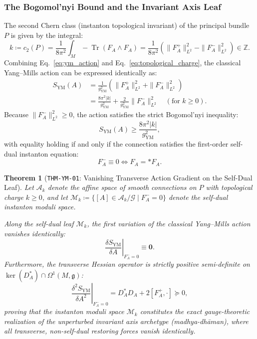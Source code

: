 \documentclass[11pt,a4paper,reqno]{article}
\theoremstyle{plain}
\newtheorem{theorem}{Theorem}[section]
\theoremstyle{definition}
\theoremstyle{remark}
\numberwithin{equation}{section}
\providecommand{\Tr}{\operatorname{Tr}}
\begin{document}
\subsubsection{The Bogomol'nyi Bound and the Invariant Axis Leaf}
The second Chern class (instanton topological invariant) of the principal bundle $P$ is given by the integral:
\begin{equation}
  k \coloneqq c_2(P) = \frac{1}{8\pi^2} \int_M -\Tr(F_A \wedge F_A) = \frac{1}{8\pi^2} \left( \|F_A^+\|_{L^2}^2 - \|F_A^-\|_{L^2}^2 \right) \in \mathbb{Z}.
  \label{eq:topological_charge}
\end{equation}
Combining Eq.~\eqref{eq:ym_action} and Eq.~\eqref{eq:topological_charge}, the classical Yang--Mills action can be expressed identically as:
\begin{align}
  S_{\mathrm{YM}}(A) &= \frac{1}{g_{\mathrm{YM}}^2} \left( \|F_A^+\|_{L^2}^2 + \|F_A^-\|_{L^2}^2 \right) \nonumber \\
  &= \frac{8\pi^2 |k|}{g_{\mathrm{YM}}^2} + \frac{2}{g_{\mathrm{YM}}^2} \|F_A^-\|_{L^2}^2 \quad (\text{for } k \ge 0).
  \label{eq:bogomolnyi_identity}
\end{align}
Because $\|F_A^-\|_{L^2}^2 \ge 0$, the action satisfies the strict Bogomol'nyi inequality:
\begin{equation}
  S_{\mathrm{YM}}(A) \ge \frac{8\pi^2 |k|}{g_{\mathrm{YM}}^2},
  \label{eq:bogomolnyi_bound}
\end{equation}
with equality holding if and only if the connection satisfies the first-order self-dual instanton equation:
\begin{equation}
  F_A^- \equiv 0 \iff F_A = *F_A.
  \label{eq:self_dual_equation}
\end{equation}

\begin{theorem}[\texttt{THM-YM-01}: Vanishing Transverse Action Gradient on the Self-Dual Leaf]
\label{thm:transverse_gradient_vanishing}
Let $\mathcal{A}_k$ denote the affine space of smooth connections on $P$ with topological charge $k \ge 0$, and let $\mathcal{M}_k \coloneqq \{ [A] \in \mathcal{A}_k / \mathcal{G} \mid F_A^- = 0 \}$ denote the self-dual instanton moduli space. 

Along the self-dual leaf $\mathcal{M}_k$, the first variation of the classical Yang--Mills action vanishes identically:
\begin{equation}
  \left. \frac{\delta S_{\mathrm{YM}}}{\delta A} \right|_{F_A^- = 0} \equiv \mathbf{0}.
\end{equation}
Furthermore, the transverse Hessian operator is strictly positive semi-definite on $\operatorname{ker}(D_A^*) \cap \Omega^1(M, \mathfrak{g})$:
\begin{equation}
  \left. \frac{\delta^2 S_{\mathrm{YM}}}{\delta A^2} \right|_{F_A^- = 0} = D_A^* D_A + 2 [F_A^+, \cdot] \succeq 0,
\end{equation}
proving that the instanton moduli space $\mathcal{M}_k$ constitutes the exact gauge-theoretic realization of the unperturbed invariant axis archetype (\emph{madhya-dh\={a}man}), where all transverse, non-self-dual restoring forces vanish identically.
\end{theorem}
\end{document}
